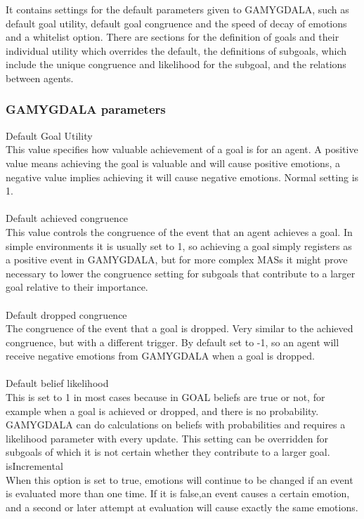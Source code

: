 \documentclass[11pt]{article}
\begin{document}
It contains settings for the default parameters given to GAMYGDALA, such as default goal utility, default goal congruence and the speed of decay of emotions and a whitelist option. There are sections for the definition of goals and their individual utility which overrides the default, the definitions of subgoals, which include the unique congruence and likelihood for the subgoal, and the relations between agents.

\subsubsection*{GAMYGDALA parameters}
Default Goal Utility\\
This value specifies how valuable achievement of a goal is for an agent. A positive value means achieving the goal is valuable and will cause positive emotions, a negative value implies achieving it will cause negative emotions. Normal setting is 1.\\
\\
Default achieved congruence\\
This value controls the congruence of the event that an agent achieves a goal. In simple environments it is usually set to 1, so achieving a goal simply registers as a positive event in GAMYGDALA, but for more complex MASs it might prove necessary to lower the congruence setting for subgoals that contribute to a larger goal relative to their importance.\\
\\
Default dropped congruence\\
The congruence of the event that a goal is dropped. Very similar to the achieved congruence, but with a different trigger. By default set to -1, so an agent will receive negative emotions from GAMYGDALA when a goal is dropped.\\
\\
Default belief likelihood\\
This is set to 1 in most cases because in GOAL beliefs are true or not, for example when a goal is achieved or dropped, and there is no probability. GAMYGDALA can do calculations on beliefs with probabilities and requires a likelihood parameter with every update. This setting can be overridden for subgoals of which it is not certain whether they contribute to a larger goal.\\
isIncremental\\
When this option is set to true, emotions will continue to be changed if an event is evaluated more than one time. If it is false,an event causes a certain emotion, and a second or later attempt at evaluation will cause exactly the same emotions.
\\
\end{document}
